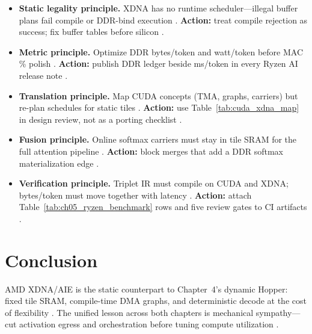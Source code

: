 \begin{itemize}
\item \textbf{Static legality principle.}
XDNA has no runtime scheduler---illegal buffer plans fail compile or DDR-bind execution \citep{amd2024xdna,amd2024aie}.
\textbf{Action:} treat compile rejection as success; fix buffer tables before silicon \citep{yirage2026}.

\item \textbf{Metric principle.}
Optimize DDR bytes/token and watt/token before MAC \% polish \citep{memoryfloor2026,patel2025llminference}.
\textbf{Action:} publish DDR ledger beside ms/token in every Ryzen AI release note \citep{amd2024xdna}.

\item \textbf{Translation principle.}
Map CUDA concepts (TMA, graphs, carriers) but re-plan schedules for static tiles \citep{semianalysis2024tma,nvidia2022hopper,amd2024aie}.
\textbf{Action:} use Table~\ref{tab:cuda_xdna_map} in design review, not as a porting checklist \citep{yirage2026}.

\item \textbf{Fusion principle.}
Online softmax carriers must stay in tile SRAM for the full attention pipeline \citep{dao2022flashattention,dao2023flashdecoding}.
\textbf{Action:} block merges that add a DDR softmax materialization edge \citep{memoryfloor2026}.

\item \textbf{Verification principle.}
Triplet IR must compile on CUDA and XDNA; bytes/token must move together with latency \citep{yirage2026,chen2020compilerbasedhardw,taxbreak2026}.
\textbf{Action:} attach Table~\ref{tab:ch05_ryzen_benchmark} rows and five review gates to CI artifacts \citep{patel2025llminference}.
\end{itemize}

\section{Conclusion}
\label{sec:ch05_conclusion}

AMD XDNA/AIE is the static counterpart to Chapter~4's dynamic Hopper: fixed tile SRAM, compile-time DMA graphs, and deterministic decode at the cost of flexibility \citep{amd2024xdna,amd2024aie,nvidia2022hopper}.
The unified lesson across both chapters is mechanical sympathy---cut activation egress and orchestration before tuning compute utilization \citep{memoryfloor2026,taxbreak2026,chen2020compilerbasedhardw}.

